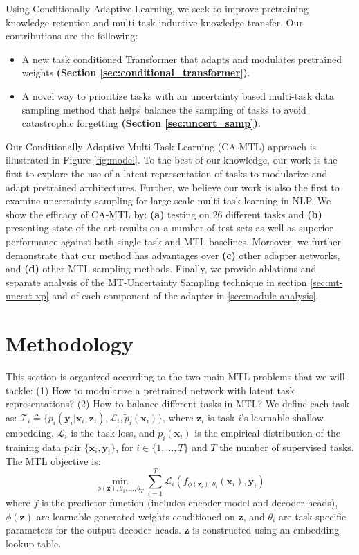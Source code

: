 \documentclass{article} \usepackage{iclr2021_conference,times}
\begin{document}
Using Conditionally Adaptive Learning, we seek to improve pretraining knowledge retention and multi-task inductive knowledge transfer. Our contributions are the following: 
\begin{itemize}[noitemsep,partopsep=0pt,topsep=0pt,parsep=0pt,leftmargin=4mm]
  \item A new task conditioned Transformer that adapts and modulates pretrained weights \textbf{(Section \ref{sec:conditional_transformer})}.
  \item A novel way to prioritize tasks with an uncertainty based multi-task data sampling method that helps balance the sampling of tasks to avoid catastrophic forgetting \textbf{(Section \ref{sec:uncert_samp})}.
\end{itemize}
Our Conditionally Adaptive Multi-Task Learning (CA-MTL) approach is illustrated in Figure \ref{fig:model}. To the best of our knowledge, our work is the first to explore the use of a latent representation of tasks to modularize and adapt pretrained architectures. Further, we believe our work is also the first to examine  uncertainty sampling for large-scale multi-task learning in NLP. We show the efficacy of CA-MTL by: \textbf{(a)} testing on 26 different tasks and \textbf{(b)} presenting state-of-the-art results on a number of test sets as well as superior performance against both single-task and MTL baselines. Moreover, we further demonstrate that our method has advantages over \textbf{(c)} other adapter networks, and \textbf{(d)} other MTL sampling methods. Finally, we provide ablations and separate analysis of the MT-Uncertainty Sampling technique in section \ref{sec:mt-uncert-xp} and of each component of the adapter in \ref{sec:module-analysis}.

\section{Methodology}
\label{sec:cond_param_share}

This section is organized according to the two main MTL problems that we will tackle: (1) How to modularize a pretrained network with latent task representations? (2) How to balance different tasks in MTL?
We define each task as:
$
    \mathscr{T}_i \triangleq \{ p_i(\textbf{y}_i|\textbf{x}_i,\textbf{z}_i), \mathscr{L}_i , \tilde{p}_i(\textbf{x}_i) \}
\label{eq:task_def}
$, 
where $\textbf{z}_i$ is task $i$'s learnable shallow embedding, $\mathscr{L}_i$ is the task loss, and $\tilde{p}_i(\textbf{x}_i)$ is the empirical distribution of the training data pair $\{\textbf{x}_i, \textbf{y}_i\}$, for $i \in \{1,\dotsc,T\}$ and $T$ the number of supervised tasks.
The MTL objective is:
\begin{equation}
    \underset{\phi(\textbf{z}),\theta_1,\dotsc,\theta_T}{\min}\sum\limits_{i=1}^T\mathscr{L}_i(f_{\phi(\textbf{z}_i),\theta_i}(\textbf{x}_i), \textbf{y}_i)
\label{eq:mt_obj}
\end{equation}
where $f$ is the predictor function (includes encoder model and decoder heads), $\phi(\textbf{z})$ are learnable generated weights conditioned on $\textbf{z}$, and $\theta_i$ are task-specific parameters for the output decoder heads. \textbf{z} is constructed using an embedding lookup table.
\end{document}

